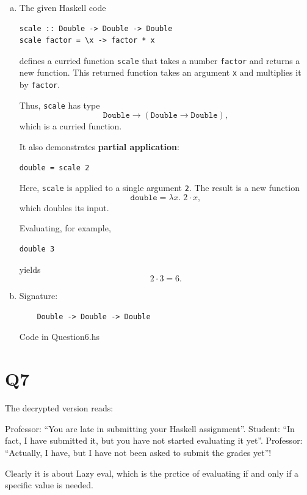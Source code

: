 \documentclass{article}
\begin{document}
\begin{enumerate}[(a)]
\item
The given Haskell code
\begin{verbatim}
scale :: Double -> Double -> Double
scale factor = \x -> factor * x
\end{verbatim}
defines a curried function \texttt{scale} that takes a number \texttt{factor} and returns a new function. This returned function takes an argument \texttt{x} and multiplies it by \texttt{factor}.

Thus, \texttt{scale} has type
\[
\texttt{Double} \to (\texttt{Double} \to \texttt{Double}),
\]
which is a curried function.

It also demonstrates \textbf{partial application}:
\begin{verbatim}
double = scale 2
\end{verbatim}
Here, \texttt{scale} is applied to a single argument \texttt{2}. The result is a new function
\[
\texttt{double} = \lambda x.\; 2 \cdot x,
\]
which doubles its input.

Evaluating, for example,
\begin{verbatim}
double 3
\end{verbatim}
yields
\[
2 \cdot 3 = 6.
\]
\item Signature:
\begin{verbatim}
    Double -> Double -> Double
\end{verbatim}
Code in Question6.hs
\end{enumerate}

\section*{Q7}
The decrypted version reads: 

Professor: ``You are late in submitting your Haskell assignment''.
Student: ``In fact, I have submitted it, but you have not started evaluating it yet''.
Professor: ``Actually, I have, but I have not been asked to submit the grades yet''!

Clearly it is about Lazy eval, which is the prctice of evaluating if and only if a specific value is needed.
\end{document}
